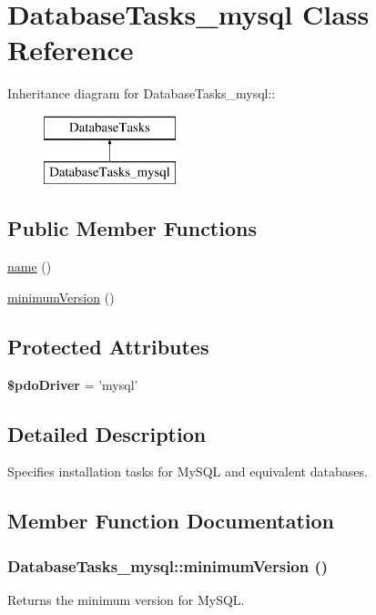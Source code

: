 \hypertarget{classDatabaseTasks__mysql}{
\section{DatabaseTasks\_\-mysql Class Reference}
\label{classDatabaseTasks__mysql}
}
Inheritance diagram for DatabaseTasks\_\-mysql::\begin{figure}[H]
\begin{center}
\leavevmode
\includegraphics[height=2cm]{classDatabaseTasks__mysql}
\end{center}
\end{figure}
\subsection*{Public Member Functions}
\begin{DoxyCompactItemize}
\item 
\hyperlink{classDatabaseTasks__mysql_ab8f790cc6df5bbde06325da137da7030}{name} ()
\item 
\hyperlink{classDatabaseTasks__mysql_a7f4a11fcaa8a2267767eb16547cf7c52}{minimumVersion} ()
\end{DoxyCompactItemize}
\subsection*{Protected Attributes}
\begin{DoxyCompactItemize}
\item 
\hypertarget{classDatabaseTasks__mysql_ad271e47ec68bcd88fc54b8a16c75464b}{
{\bfseries \$pdoDriver} = 'mysql'}
\label{classDatabaseTasks__mysql_ad271e47ec68bcd88fc54b8a16c75464b}

\end{DoxyCompactItemize}


\subsection{Detailed Description}
Specifies installation tasks for MySQL and equivalent databases. 

\subsection{Member Function Documentation}
\hypertarget{classDatabaseTasks__mysql_a7f4a11fcaa8a2267767eb16547cf7c52}{
\subsubsection[{minimumVersion}]{\setlength{\rightskip}{0pt plus 5cm}DatabaseTasks\_\-mysql::minimumVersion ()}}
\label{classDatabaseTasks__mysql_a7f4a11fcaa8a2267767eb16547cf7c52}
Returns the minimum version for MySQL. 

